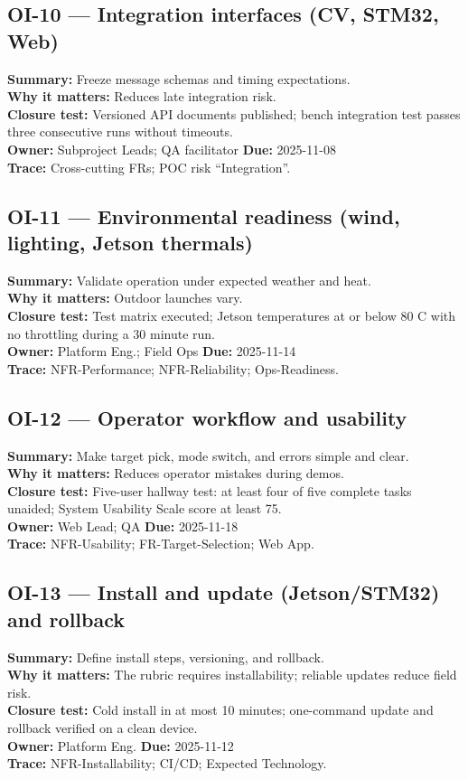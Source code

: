 \documentclass[12pt]{article}
\begin{document}
\subsection*{OI-10 — Integration interfaces (CV, STM32, Web)}
\textbf{Summary:} Freeze message schemas and timing expectations.\\
\textbf{Why it matters:} Reduces late integration risk.\\
\textbf{Closure test:} Versioned API documents published; bench integration test passes three consecutive runs without timeouts.\\
\textbf{Owner:} Subproject Leads; QA facilitator \quad \textbf{Due:} 2025-11-08\\
\textbf{Trace:} Cross-cutting FRs; POC risk “Integration”.

\subsection*{OI-11 — Environmental readiness (wind, lighting, Jetson thermals)}
\textbf{Summary:} Validate operation under expected weather and heat.\\
\textbf{Why it matters:} Outdoor launches vary.\\
\textbf{Closure test:} Test matrix executed; Jetson temperatures at or below 80 C with no throttling during a 30 minute run.\\
\textbf{Owner:} Platform Eng.; Field Ops \quad \textbf{Due:} 2025-11-14\\
\textbf{Trace:} NFR-Performance; NFR-Reliability; Ops-Readiness.

\subsection*{OI-12 — Operator workflow and usability}
\textbf{Summary:} Make target pick, mode switch, and errors simple and clear.\\
\textbf{Why it matters:} Reduces operator mistakes during demos.\\
\textbf{Closure test:} Five-user hallway test: at least four of five complete tasks unaided; System Usability Scale score at least 75.\\
\textbf{Owner:} Web Lead; QA \quad \textbf{Due:} 2025-11-18\\
\textbf{Trace:} NFR-Usability; FR-Target-Selection; Web App.

\subsection*{OI-13 — Install and update (Jetson/STM32) and rollback}
\textbf{Summary:} Define install steps, versioning, and rollback.\\
\textbf{Why it matters:} The rubric requires installability; reliable updates reduce field risk.\\
\textbf{Closure test:} Cold install in at most 10 minutes; one-command update and rollback verified on a clean device.\\
\textbf{Owner:} Platform Eng. \quad \textbf{Due:} 2025-11-12\\
\textbf{Trace:} NFR-Installability; CI/CD; Expected Technology.
\end{document}
